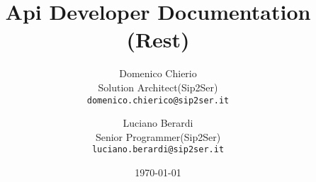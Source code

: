 \author{Domenico Chierio\\
\small{Solution Architect(Sip2Ser)}\\
\small \texttt{domenico.chierico@sip2ser.it}\\
\and
Luciano Berardi\\
\small{Senior Programmer(Sip2Ser)} \\
\small \texttt{luciano.berardi@sip2ser.it}\\
}

\title{Api Developer Documentation (Rest)}

\date{\today}
